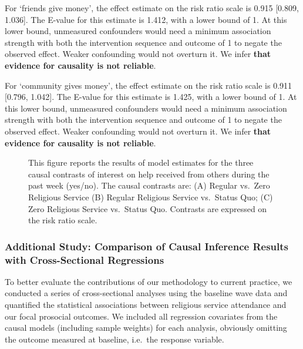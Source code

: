 \documentclass[
  single column]{article}
\begin{document}
For `friends give money', the effect estimate on the risk ratio scale is
0.915 {[}0.809, 1.036{]}. The E-value for this estimate is 1.412, with a
lower bound of 1. At this lower bound, unmeasured confounders would need
a minimum association strength with both the intervention sequence and
outcome of 1 to negate the observed effect. Weaker confounding would not
overturn it. We infer \textbf{that evidence for causality is not
reliable}.

For `community gives money', the effect estimate on the risk ratio scale
is 0.911 {[}0.796, 1.042{]}. The E-value for this estimate is 1.425,
with a lower bound of 1. At this lower bound, unmeasured confounders
would need a minimum association strength with both the intervention
sequence and outcome of 1 to negate the observed effect. Weaker
confounding would not overturn it. We infer \textbf{that evidence for
causality is not reliable}.

\begin{figure}


\caption{\label{fig-study_3}This figure reports the results of model
estimates for the three causal contrasts of interest on help received
from others during the past week (yes/no). The causal contrasts are: (A)
Regular vs.~Zero Religious Service (B) Regular Religious Service
vs.~Status Quo; (C) Zero Religious Service vs.~Status Quo. Contrasts are
expressed on the risk ratio scale.}

\end{figure}%

\newpage{}

\subsubsection{Additional Study: Comparison of Causal Inference Results
with Cross-Sectional
Regressions}\label{additional-study-comparison-of-causal-inference-results-with-cross-sectional-regressions}

To better evaluate the contributions of our methodology to current
practice, we conducted a series of cross-sectional analyses using the
baseline wave data and quantified the statistical associations between
religious service attendance and our focal prosocial outcomes. We
included all regression covariates from the causal models (including
sample weights) for each analysis, obviously omitting the outcome
measured at baseline, i.e.~the response variable.
\end{document}
